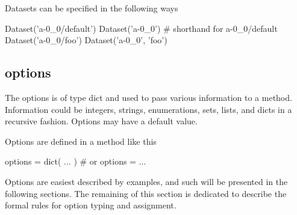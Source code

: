 Datasets can be specified in the following ways

\begin{python}
Dataset('a-0_0/default')
Dataset('a-0_0')          # shorthand for a-0_0/default
Dataset('a-0_0/foo')
Dataset('a-0_0', 'foo')
\end{python}



\subsection{options}
The options is of type dict and used to pass various information to a
method.  Information could be integers, strings, enumerations, sets,
lists, and dicts in a recursive fashion.  Options may have a default
value.




Options are defined in a method like this

\begin{python}
  options = dict( ... )  # or
  options = { ... }
\end{python}

Options are easiest described by examples, and such will be presented
in the following sections.  The remaining of this section is dedicated
to describe the formal rules for option typing and assignment.





